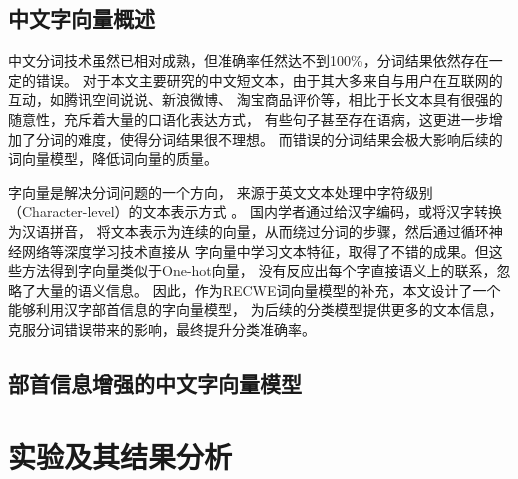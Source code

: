 \subsection{中文字向量概述}
中文分词技术虽然已相对成熟，但准确率任然达不到100\%，分词结果依然存在一定的错误。
对于本文主要研究的中文短文本，由于其大多来自与用户在互联网的互动，如腾讯空间说说、新浪微博、
淘宝商品评价等，相比于长文本具有很强的随意性，充斥着大量的口语化表达方式，
有些句子甚至存在语病，这更进一步增加了分词的难度，使得分词结果很不理想。
而错误的分词结果会极大影响后续的词向量模型，降低词向量的质量。

字向量是解决分词问题的一个方向，
来源于英文文本处理中字符级别（Character-level）的文本表示方式
。
国内学者通过给汉字编码，或将汉字转换为汉语拼音，
将文本表示为连续的向量，从而绕过分词的步骤，然后通过循环神经网络等深度学习技术直接从
字向量中学习文本特征，取得了不错的成果。但这些方法得到字向量类似于One-hot向量，
没有反应出每个字直接语义上的联系，忽略了大量的语义信息。
因此，作为RECWE词向量模型的补充，本文设计了一个能够利用汉字部首信息的字向量模型，
为后续的分类模型提供更多的文本信息，克服分词错误带来的影响，最终提升分类准确率。


\subsection{部首信息增强的中文字向量模型}
\section{实验及其结果分析}